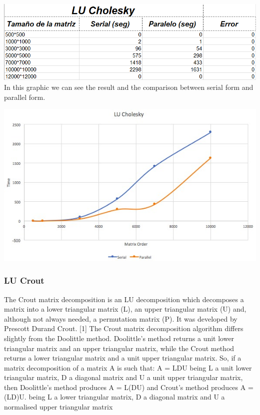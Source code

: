 \documentclass{article}
\newcounter{subsubsubsection}[subsubsection]
\begin{document}

\includegraphics[width=\linewidth]{./images/cholesky.PNG}\\
In this graphic we can see the result and the comparison between serial form and parallel form.

\includegraphics[width=\linewidth]{./images/gluch.jpeg}\\


\subsubsection{LU Crout}


The Crout matrix decomposition is an LU decomposition which decomposes a matrix into a lower triangular matrix (L), an upper triangular matrix (U) and, although not always needed, a permutation matrix (P). It was developed by Prescott Durand Crout. [1]
The Crout matrix decomposition algorithm differs slightly from the Doolittle method. Doolittle's method returns a unit lower triangular matrix and an upper triangular matrix, while the Crout method returns a lower triangular matrix and a unit upper triangular matrix.
So, if a matrix decomposition of a matrix A is such that:
A = LDU
being L a unit lower triangular matrix, D a diagonal matrix and U a unit upper triangular matrix, then Doolittle's method produces
A = L(DU)
and Crout's method produces
A = (LD)U.
being L a lower triangular matrix, D a diagonal matrix and U a normalised upper triangular matrix
\end{document}
